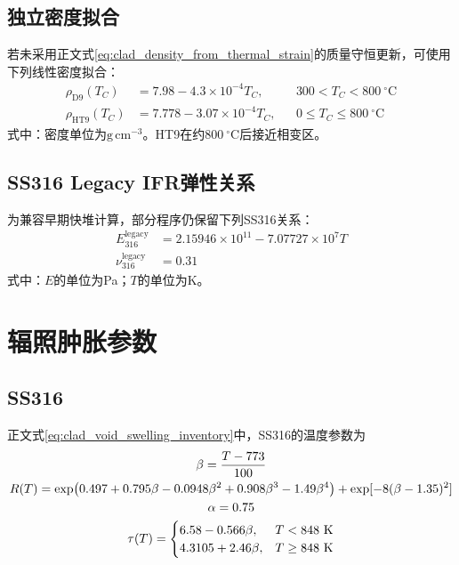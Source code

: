 \subsection{独立密度拟合}

若未采用正文式\eqref{eq:clad_density_from_thermal_strain}的质量守恒更新，可使用下列线性密度拟合：
\begin{equation}
	\label{eq:appendix_cladding_density_fits}
	\begin{aligned}
		\rho_{\mathrm{D9}}(T_C)
		&=7.98-4.3\times10^{-4}T_C,
		&&300<T_C<800\ ^\circ\mathrm C\\
		\rho_{\mathrm{HT9}}(T_C)
		&=7.778-3.07\times10^{-4}T_C,
		&&0\leq T_C\leq800\ ^\circ\mathrm C
	\end{aligned}
\end{equation}
式中：密度单位为$\mathrm{g\,cm^{-3}}$。HT9在约$800\ ^\circ\mathrm C$后接近相变区。

\subsection{SS316 Legacy IFR弹性关系}

为兼容早期快堆计算，部分程序仍保留下列SS316关系：
\begin{equation}
	\label{eq:appendix_ss316_legacy_elasticity}
	\begin{aligned}
		E_{316}^{\mathrm{legacy}}
		&=2.15946\times10^{11}-7.07727\times10^7T\\
		\nu_{316}^{\mathrm{legacy}}&=0.31
	\end{aligned}
\end{equation}
式中：$E$的单位为Pa；$T$的单位为K。

\section{辐照肿胀参数}
\label{app:cladding_swelling_parameters}

\subsection{SS316}

正文式\eqref{eq:clad_void_swelling_inventory}中，SS316的温度参数为\cite{halesBISONTheoryManual2016,hofmanMetallicFuelsHandbook2019}
\begin{gather}
	\beta=\frac{T-773}{100}
	\notag
	\\
	R(T)=\exp\!\left(
	0.497+0.795\beta-0.0948\beta^2
	+0.908\beta^3-1.49\beta^4
	\right)
	+\exp[-8(\beta-1.35)^2]
	\notag
	\\
	\alpha=0.75
	\notag
	\\
	\tau(T)=
	\begin{cases}
		6.58-0.566\beta, & T<848\ \mathrm{K}\\
		4.3105+2.46\beta, & T\geq848\ \mathrm{K}
	\end{cases}
	\label{eq:appendix_ss316_swelling_parameters}
\end{gather}

